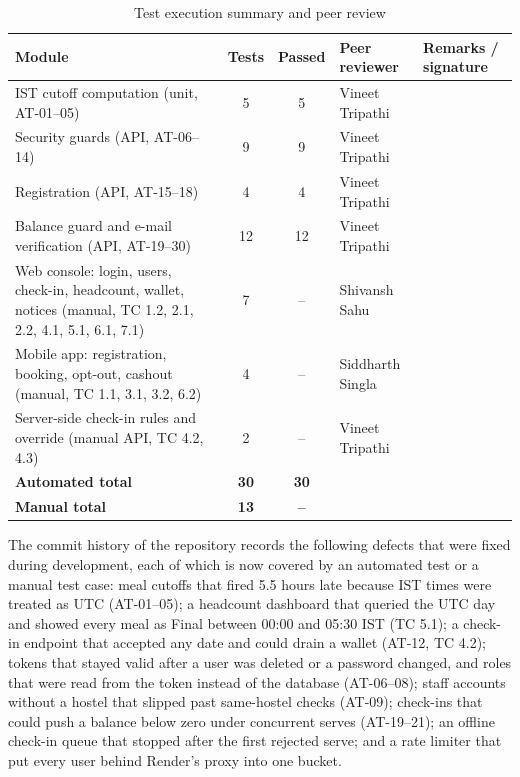 \documentclass[11pt,a4paper]{article}
\begin{document}
\begin{table}[H]
\centering
\caption{Test execution summary and peer review}
\label{tab:peer}
\small
\begin{tabular}{@{}L{6.0cm}ccL{2.8cm}L{2.8cm}@{}}
\toprule
\textbf{Module} & \textbf{Tests} & \textbf{Passed} & \textbf{Peer reviewer} & \textbf{Remarks / signature}\\
\midrule
IST cutoff computation (unit, AT-01--05) & 5 & 5 & Vineet Tripathi & \\
Security guards (API, AT-06--14) & 9 & 9 & Vineet Tripathi & \\
Registration (API, AT-15--18) & 4 & 4 & Vineet Tripathi & \\
Balance guard and e-mail verification (API, AT-19--30) & 12 & 12 & Vineet Tripathi & \\
Web console: login, users, check-in, headcount, wallet, notices (manual, TC 1.2, 2.1, 2.2, 4.1, 5.1, 6.1, 7.1) & 7 & -- & Shivansh Sahu & \\
Mobile app: registration, booking, opt-out, cashout (manual, TC 1.1, 3.1, 3.2, 6.2) & 4 & -- & Siddharth Singla & \\
Server-side check-in rules and override (manual API, TC 4.2, 4.3) & 2 & -- & Vineet Tripathi & \\
\midrule
\textbf{Automated total} & \textbf{30} & \textbf{30} & & \\
\textbf{Manual total} & \textbf{13} & \textbf{--} & & \\
\bottomrule
\end{tabular}
\end{table}

The commit history of the repository records the following defects that were
fixed during development, each of which is now covered by an automated test or a manual test
case: meal cutoffs that fired 5.5 hours late because IST times were treated as
UTC (AT-01--05); a headcount dashboard that queried the UTC day and showed every
meal as Final between 00:00 and 05:30 IST (TC 5.1); a check-in endpoint that
accepted any date and could drain a wallet (AT-12, TC 4.2); tokens that stayed
valid after a user was deleted or a password changed, and roles that were read
from the token instead of the database (AT-06--08); staff accounts without a
hostel that slipped past same-hostel checks (AT-09); check-ins that could push a
balance below zero under concurrent serves (AT-19--21); an offline check-in
queue that stopped after the first rejected serve; and a rate limiter that put
every user behind Render's proxy into one bucket.
\end{document}

